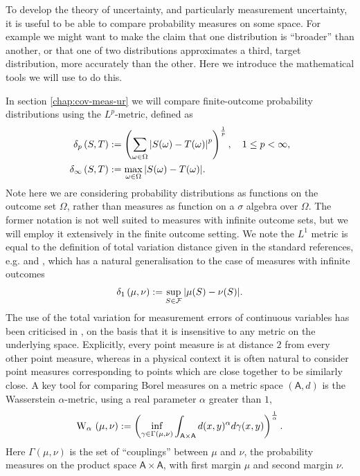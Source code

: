 To develop the theory of uncertainty, and particularly measurement uncertainty, it is useful to be able to compare probability measures on some space. For example we might want to make the claim that one distribution is ``broader'' than another, or that one of two distributions approximates a third, target distribution, more accurately than the other. Here we introduce the mathematical tools we will use to do this.

In section \ref{chap:cov-meas-ur} we will compare finite-outcome probability distributions using the $L^p$-metric, defined as
\begin{align}
  \label{eqn:lpvar-defn}
  \lPVar{S}{T}[p]&\defeq \left(\sum_{\omega\in\Omega} \abs{S(\omega) - T(\omega)}^p\right)^\frac{1}{p}, \quad 1\leq p < \infty,\\
  \lPVar{S}{T}[\infty] &\defeq \max_{\omega\in\Omega} \abs{S(\omega) - T(\omega)}.
\end{align}
Note here we are considering probability distributions as functions on the outcome set $\Omega$, rather than measures as function on a $\sigma$ algebra over $\Omega$. The former notation is not well suited to measures with infinite outcome sets, but we will employ it extensively in the finite outcome setting. We note the $L^1$ metric is equal to the definition of total variation distance given in the standard references, e.g. \cite{optimal-transport-villani} and \cite{topics-optimal-transport}, which has a natural generalisation to the case of measures with infinite outcomes
\begin{align}
  \lPVar{\mu}{\nu}[1] \defeq \sup_{S\in\fcal}\abs{\mu(S) - \nu(S)}.
\end{align}
The use of the total variation for measurement errors of continuous variables has been criticised in \cite{blw-meas-uncertainty}, on the basis that it is insensitive to any metric on the underlying space. Explicitly, every point measure is at distance $2$ from every other point measure, whereas in a physical context it is often natural to consider point measures corresponding to points which are close together to be similarly close.
A key tool for comparing Borel measures on a metric space $(\mathsf{A}, d)$ is the Wasserstein $\alpha$-metric, using a real parameter $\alpha$ greater than $1$,
\begin{align}
  \ws{\mu,\nu}[\alpha]  \defeq \left(\inf_{\gamma\in\Gamma(\mu,\nu)} \int_{\mathsf{A}\times\mathsf{A}} d(x,y)^\alpha d\gamma(x,y)\right)^\frac{1}{\alpha}.\label{eq:wasserstein-prob-dists}
\end{align}
Here $\Gamma(\mu,\nu)$ is the set of ``couplings'' between $\mu$ and $\nu$, the probability measures on the product space $\mathsf{A}\times\mathsf{A}$, with first margin $\mu$ and second margin $\nu$.

